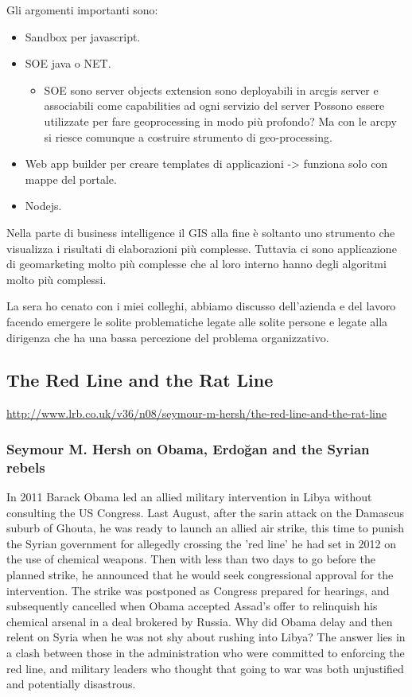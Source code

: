 Gli argomenti importanti sono:
\begin{itemize}
\item Sandbox per javascript.
\item SOE java o NET.

\begin{itemize}
\item SOE sono server objects extension sono deployabili in arcgis server
e associabili come capabilities ad ogni servizio del server \Circle{}
Possono essere utilizzate per fare geoprocessing in modo più profondo?
Ma con le arcpy si riesce comunque a costruire strumento di geo-processing.
\end{itemize}
\item Web app builder per creare templates di applicazioni -> funziona solo
con mappe del portale.
\item Nodejs.
\end{itemize}
Nella parte di business intelligence il GIS alla fine è soltanto uno
strumento che visualizza i risultati di elaborazioni più complesse.
Tuttavia ci sono applicazione di geomarketing molto più complesse
che al loro interno hanno degli algoritmi molto più complessi.

La sera ho cenato con i miei colleghi, abbiamo discusso dell'azienda
e del lavoro facendo emergere le solite problematiche legate alle
solite persone e legate alla dirigenza che ha una bassa percezione
del problema organizzativo.


\subsection{The Red Line and the Rat Line}

\url{http://www.lrb.co.uk/v36/n08/seymour-m-hersh/the-red-line-and-the-rat-line}


\subsubsection{Seymour M. Hersh on Obama, Erdo\u{g}an and the Syrian rebels}

In 2011 Barack Obama led an allied military intervention in Libya
without consulting the US Congress. Last August, after the sarin attack
on the Damascus suburb of Ghouta, he was ready to launch an allied
air strike, this time to punish the Syrian government for allegedly
crossing the 'red line' he had set in 2012 on the use of chemical
weapons. Then with less than two days to go before the planned strike,
he announced that he would seek congressional approval for the intervention.
The strike was postponed as Congress prepared for hearings, and subsequently
cancelled when Obama accepted Assad's offer to relinquish his chemical
arsenal in a deal brokered by Russia. Why did Obama delay and then
relent on Syria when he was not shy about rushing into Libya? The
answer lies in a clash between those in the administration who were
committed to enforcing the red line, and military leaders who thought
that going to war was both unjustified and potentially disastrous.


